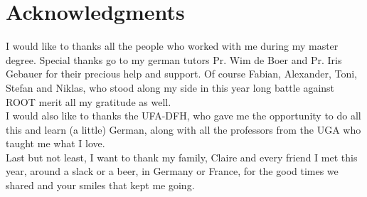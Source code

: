 \chapter*{Acknowledgments}
\label{ch:acknowledgments}


I would like to thanks all the people who worked with me during my master degree. Special thanks go to my german tutors Pr. Wim de Boer and Pr. Iris Gebauer for their precious help and support. Of course Fabian, Alexander, Toni, Stefan and Niklas, who stood along my side in this year long battle against ROOT merit all my gratitude as well.\\

I would also like to thanks the UFA-DFH, who gave me the opportunity to do all this and learn (a little) German, along with all the professors from the UGA who taught me what I love.\\

Last but not least, I want to thank my family, Claire and every friend I met this year, around a slack or a beer, in Germany or France, for the good times we shared and your smiles that kept me going.
